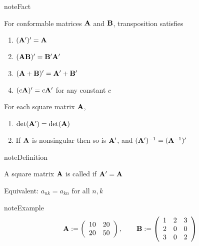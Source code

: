 \documentclass[letterpaper,10pt,english]{jupyterBook}
\begin{document}
\begin{sphinxadmonition}{note}{Fact}

\sphinxAtStartPar
For conformable matrices \({\bf A}\) and \({\bf B}\), transposition satisfies
\begin{enumerate}
%
\item {} 
\sphinxAtStartPar
\(({\bf A}')' = {\bf A}\)

\item {} 
\sphinxAtStartPar
\(({\bf A} {\bf B})' = {\bf B}' {\bf A}'\)

\item {} 
\sphinxAtStartPar
\(({\bf A} + {\bf B})' = {\bf A}' + {\bf B}'\)

\item {} 
\sphinxAtStartPar
\((c {\bf A})' = c {\bf A}'\) for any constant \(c\)

\end{enumerate}

\sphinxAtStartPar
For each square matrix \({\bf A}\),
\begin{enumerate}
%
\item {} 
\sphinxAtStartPar
\(\det({\bf A}') = \det({\bf A})\)

\item {} 
\sphinxAtStartPar
If \({\bf A}\) is nonsingular then so is \({\bf A}'\), and \(({\bf A}')^{-1}= ({\bf A}^{-1})'\)

\end{enumerate}
\end{sphinxadmonition}

\begin{sphinxadmonition}{note}{Definition}

\sphinxAtStartPar
A square matrix \({\bf A}\) is called  if \({\bf A}' = {\bf A}\)
\end{sphinxadmonition}

\sphinxAtStartPar
Equivalent: \(a_{nk} = a_{kn}\) for all \(n, k\)

\begin{sphinxadmonition}{note}{Example}
\begin{equation*}
\begin{split}
%
{\bf A} 
:= 
\left(
\begin{array}{cc}
10 & 20 \\
20 & 50 
\end{array}
\right),
\qquad
{\bf B} 
:= 
\left(
\begin{array}{ccc}
1 & 2 & 3 \\
2 & 0 & 0 \\ 
3 & 0 & 2 
\end{array}
\right)
%
\end{split}
\end{equation*}\end{sphinxadmonition}
\end{document}
